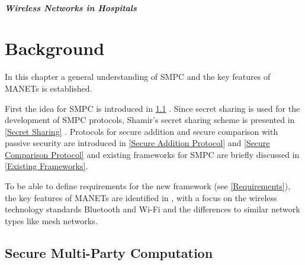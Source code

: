 \paragraph{Wireless Networks in Hospitals}

\FloatBarrier



\chapter{Background} \label{Background}



In this chapter a general understanding of \gls{SMPC} and the key features of \glspl{MANET} is established.  

First the idea for \gls{SMPC} is introduced in \ref{Secure Multi-Party Computation} . Since secret sharing is used for the development of \gls{SMPC} protocols, Shamir's secret sharing scheme is presented in \ref{Secret Sharing} .
Protocols for secure addition and secure comparison with passive security are introduced in \ref{Secure Addition Protocol} and \ref{Secure Comparison Protocol} and existing frameworks for \gls{SMPC} are briefly discussed in \ref{Existing Frameworks}.

To be able to define requirements for the new framework (see \ref{Requirements}), the key features of \glspl{MANET} are identified in , with a focus on the wireless technology standards Bluetooth and Wi-Fi and the differences to similar network types like mesh networks.


\section{Secure Multi-Party Computation} \label{Secure Multi-Party Computation}

